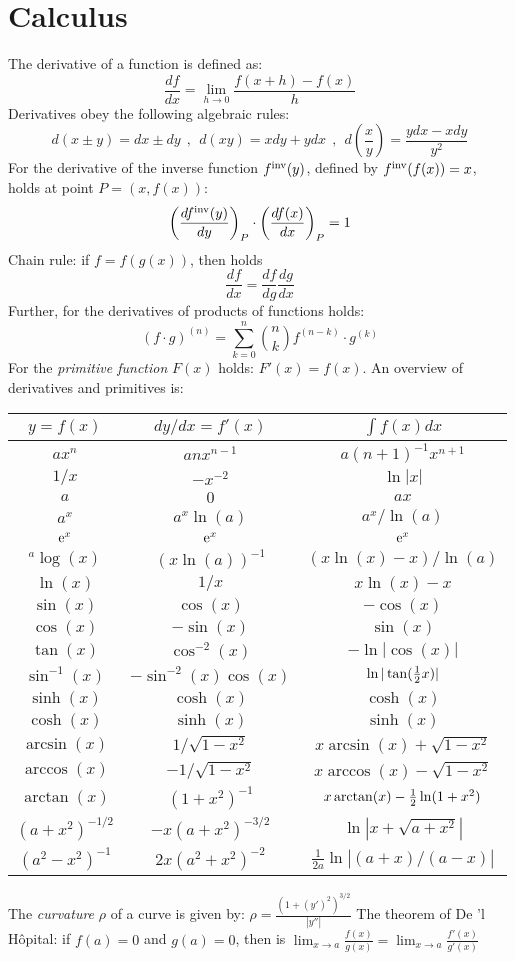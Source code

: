 \documentclass[a4paper,fancyheadings,twoside]{report}
\begin{document}
\section{Calculus}
The derivative of a function is defined as:
\[
\frac{df}{dx}=\lim_{h\rightarrow0}\frac{f(x+h)-f(x)}{h}
\]
Derivatives obey the following algebraic rules:
\[
d(x\pm y)=dx\pm dy~~,~~d(xy)=xdy+ydx~~,~~d\left(\frac{x}{y}\right)=\frac{ydx-xdy}{y^2}
\]
For the derivative of the inverse function $f^{\rm inv}(y)$, defined by
$f^{\rm inv}(f(x))=x$, holds at point $P=(x,f(x))$:
\[
\left(\frac{df^{\rm inv}(y)}{dy}\right)_P\cdot\left(\frac{df(x)}{dx}\right)_P=1
\]
Chain rule: if $f=f(g(x))$, then holds
\[
\frac{df}{dx}=\frac{df}{dg}\frac{dg}{dx}
\]
Further, for the derivatives of products of functions holds:
\[
(f\cdot g)^{(n)}=\sum\limits_{k=0}^n{n\choose k}f^{(n-k)}\cdot g^{(k)}
\]
For the {\it primitive function} $F(x)$ holds: $F'(x)=f(x)$.
An overview of derivatives and primitives is:
\begin{center}
\begin{tabular}{||c|c|c||}
\hline
\boldmath$y=f(x)$\unboldmath&\boldmath$dy/dx=f'(x)$\unboldmath&\boldmath$\int f(x)dx$\rule{0pt}{12pt}\rule[-7pt]{0pt}{0pt}\unboldmath\\
\hline
\hline
$ax^n$&$anx^{n-1}$&$a(n+1)^{-1}x^{n+1}$\rule{0pt}{12pt}\\
$1/x$&$-x^{-2}$&$\ln|x|$\\
$a$&$0$&$ax$\\
\hline
$a^x$&$a^x\ln(a)$&$a^x/\ln(a)$\rule{0pt}{12pt}\\
${\rm e}^x$&${\rm e}^x$&${\rm e}^x$\\
$^a\log(x)$&$(x\ln(a))^{-1}$&$(x\ln(x)-x)/\ln(a)$\\
$\ln(x)$&$1/x$&$x\ln(x)-x$\\
\hline
$\sin(x)$&$\cos(x)$&$-\cos(x)$\\
$\cos(x)$&$-\sin(x)$&$\sin(x)$\\
$\tan(x)$&$\cos^{-2}(x)$&$-\ln|\cos(x)|$\\
$\sin^{-1}(x)$&$-\sin^{-2}(x)\cos(x)$&$\ln|\tan(\mbox{$\frac{1}{2}$} x)|$\\
$\sinh(x)$&$\cosh(x)$&$\cosh(x)$\\
$\cosh(x)$&$\sinh(x)$&$\sinh(x)$\\
$\arcsin(x)$&$1/\sqrt{1-x^2}$&$x\arcsin(x)+\sqrt{1-x^2}$\\
$\arccos(x)$&$-1/\sqrt{1-x^2}$&$x\arccos(x)-\sqrt{1-x^2}$\\
$\arctan(x)$&$(1+x^2)^{-1}$&$x\arctan(x)-\mbox{$\frac{1}{2}$}\ln(1+x^2)$\rule[-7pt]{0pt}{0pt}\\
\hline
$(a+x^2)^{-1/2}$&$-x(a+x^2)^{-3/2}$&$\ln|x+\sqrt{a+x^2}|$\rule{0pt}{12pt}\\
$(a^2-x^2)^{-1}$&$2x(a^2+x^2)^{-2}$&$\displaystyle\frac{1}{2a}\ln|(a+x)/(a-x)|$\rule[-10pt]{0pt}{23pt}\\
\hline
\end{tabular}
\end{center}
The {\it curvature} $\rho$ of a curve is given by:
$\displaystyle\rho=\frac{(1+(y')^2)^{3/2}}{|y''|}$
\npar
The theorem of De 'l H\^opital: if $f(a)=0$ and $g(a)=0$, then is
$\displaystyle\lim_{x\rightarrow a}\frac{f(x)}{g(x)}=\lim_{x\rightarrow a}\frac{f'(x)}{g'(x)}$
\end{document}

